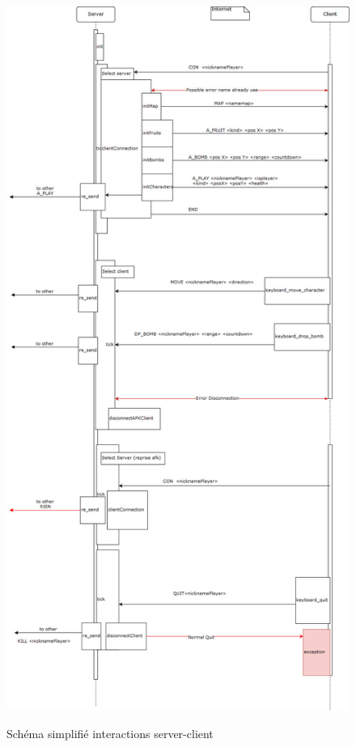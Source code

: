\documentclass[a4paper]{article}
\begin{document}
\newpage
\begin{figure}[!htbp]
	\centering
	\includegraphics[height=0.9\textheight]{IMG_Latex/ProgrammLifeTime.jpg}\\
	\caption{Schéma simplifié interactions server-client}
	\label{shema/lifeTime}
\end{figure}
		
\end{document}
